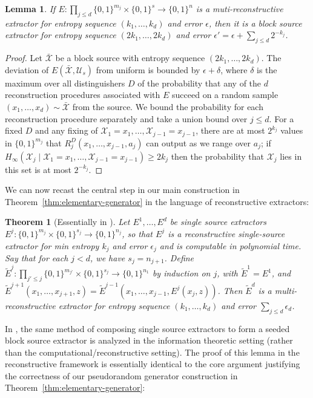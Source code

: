 \documentclass[11pt]{article}
\newtheorem{theorem}{Theorem}
\newtheorem{lemma}{Lemma}
\newcommand{\B}{\{0,1\}}
\begin{document}
\begin{lemma}\label{lem:recon-to-CG}
If $E: \prod_{j \leq d} \B^{m_j} \times \B^{s} \to \B^n$ is a muti-reconstructive extractor for entropy sequence $(k_1,\ldots,k_d)$ and error $\epsilon$, then it is a block source extractor for entropy sequence $(2k_1,\ldots,2k_d)$ and error $\epsilon' = \epsilon + \sum_{j\leq d} 2^{-k_j}$.
\end{lemma}
\begin{proof}
Let $\bar{\mathcal{X}}$ be a block source with entropy sequence $(2k_1,\ldots,2k_d)$. The deviation of $E(\bar{\mathcal{X}}, \mathcal{U}_s)$ from uniform is bounded by $\epsilon + \delta$, where $\delta$ is the maximum over all distinguishers $D$ of the probability that any of the $d$ reconstruction procedures associated with $E$ succeed on a random sample $(x_1,\ldots,x_d) \sim \bar{\mathcal{X}}$ from the source. We bound the probability for each reconstruction procedure separately and take a union bound over $j \leq d$. For a fixed $D$ and any fixing of $\mathcal{X}_1 = x_1,\ldots,\mathcal{X}_{j-1} = x_{j-1}$, there are at most $2^{k_j}$ values in $\B^{m_j}$ that $R_j^D(x_1,\ldots,x_{j-1},a_j)$ can output as we range over $a_j$; if $H_{\infty}(\mathcal{X}_j \mid \mathcal{X}_1 = x_1,\ldots,\mathcal{X}_{j-1} = x_{j-1}) \geq 2k_j$ then the probability that $\mathcal{X}_j$ lies in this set is at most $2^{-k_j}$.
\end{proof}
We can now recast the central step in our main construction in Theorem~\ref{thm:elementary-generator} in the language of reconstructive extractors:
\begin{theorem}[Essentially in \cite{NZ}]
Let $E^1,\ldots,E^d$ be single source extractors $E^j: \B^{m_j} \times \B^{s_j} \to \B^{n_j}$, so that $E^j$ is a reconstructive single-source extractor for min entropy $k_j$ and error $\epsilon_j$ and is computable in polynomial time. Say that for each $j < d$, we have $s_j = n_{j+1}$. Define $\tilde{E}^j: \prod_{j' \leq j} \B^{m_{j'}} \times \B^{s_j} \to \B^{n_1}$ by induction on $j$, with $\tilde{E}^1 = E^1$, and $\tilde{E} ^{j+1}(x_1,\ldots,x_{j+1},z) = \tilde{E}^{j-1}(x_1,\ldots,x_{j-1}, E^j(x_j, z))$. Then $\tilde{E}^d$ is a multi-reconstructive extractor for entropy sequence $(k_1,\ldots,k_d)$ and error $\sum_{j \leq d} \epsilon_d$. 
\end{theorem}
In \cite{NZ}, the same method of composing single source extractors to form a seeded block source extractor is analyzed in the information theoretic setting (rather than the computational/reconstructive setting). The proof of this lemma in the reconstructive framework is essentially identical to the core argument justifying the correctness of our pseudorandom generator construction in Theorem~\ref{thm:elementary-generator}:
\end{document}
